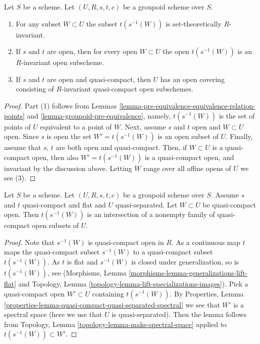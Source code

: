 \begin{lemma}
\label{lemma-constructing-invariant-opens}
Let $S$ be a scheme.
Let $(U, R, s, t, c)$ be a groupoid scheme over $S$.
\begin{enumerate}
\item For any subset $W \subset U$ the subset $t(s^{-1}(W))$
is set-theoretically $R$-invariant.
\item If $s$ and $t$ are open, then for every open $W \subset U$
the open $t(s^{-1}(W))$ is an $R$-invariant open subscheme.
\item If $s$ and $t$ are open and quasi-compact, then $U$ has an open
covering consisting of $R$-invariant quasi-compact open subschemes.
\end{enumerate}
\end{lemma}

\begin{proof}
Part (1) follows from
Lemmas \ref{lemma-pre-equivalence-equivalence-relation-points} and
\ref{lemma-groupoid-pre-equivalence}, namely, $t(s^{-1}(W))$
is the set of points of $U$ equivalent to a point of $W$.
Next, assume $s$ and $t$ open and $W \subset U$ open.
Since $s$ is open the set $W' = t(s^{-1}(W))$ is an open subset of $U$.
Finally, assume that $s$, $t$ are both open and quasi-compact.
Then, if $W \subset U$ is a quasi-compact open, then also
$W' = t(s^{-1}(W))$ is a quasi-compact open, and invariant by the
discussion above. Letting $W$ range over all affine opens of $U$
we see (3).
\end{proof}

\begin{lemma}
\label{lemma-first-observation}
Let $S$ be a scheme. Let $(U, R, s, t, c)$ be a groupoid scheme over $S$.
Assume $s$ and $t$ quasi-compact and flat and $U$ quasi-separated.
Let $W \subset U$ be quasi-compact open. Then $t(s^{-1}(W))$
is an intersection of a nonempty family of quasi-compact open subsets of $U$.
\end{lemma}

\begin{proof}
Note that $s^{-1}(W)$ is quasi-compact open in $R$.
As a continuous map $t$ maps the quasi-compact subset
$s^{-1}(W)$ to a quasi-compact subset $t(s^{-1}(W))$.
As $t$ is flat and $s^{-1}(W)$ is closed under generalization,
so is $t(s^{-1}(W))$, see
(Morphisms, Lemma \ref{morphisms-lemma-generalizations-lift-flat} and
Topology, Lemma \ref{topology-lemma-lift-specializations-images}).
Pick a quasi-compact open $W' \subset U$ containing $t(s^{-1}(W))$. By
Properties, Lemma \ref{properties-lemma-quasi-compact-quasi-separated-spectral}
we see that $W'$ is a spectral space (here we use that $U$ is quasi-separated).
Then the lemma follows from
Topology, Lemma \ref{topology-lemma-make-spectral-space}
applied to $t(s^{-1}(W)) \subset W'$.
\end{proof}

